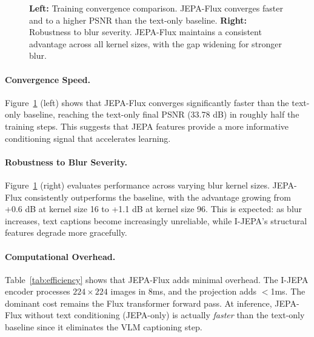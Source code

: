 \documentclass{article}
\begin{document}
\begin{figure}[t]
    \caption{\textbf{Left:} Training convergence comparison. JEPA-Flux converges faster and to a higher PSNR than the text-only baseline. \textbf{Right:} Robustness to blur severity. JEPA-Flux maintains a consistent advantage across all kernel sizes, with the gap widening for stronger blur.}
    \label{fig:analysis}
\end{figure}

\paragraph{Convergence Speed.}
Figure~\ref{fig:analysis} (left) shows that JEPA-Flux converges significantly faster than the text-only baseline, reaching the text-only final PSNR (33.78 dB) in roughly half the training steps. This suggests that JEPA features provide a more informative conditioning signal that accelerates learning.

\paragraph{Robustness to Blur Severity.}
Figure~\ref{fig:analysis} (right) evaluates performance across varying blur kernel sizes. JEPA-Flux consistently outperforms the baseline, with the advantage growing from +0.6 dB at kernel size 16 to +1.1 dB at kernel size 96. This is expected: as blur increases, text captions become increasingly unreliable, while I-JEPA's structural features degrade more gracefully.

\paragraph{Computational Overhead.}
Table~\ref{tab:efficiency} shows that JEPA-Flux adds minimal overhead. The I-JEPA encoder processes $224 \times 224$ images in 8ms, and the projection adds $<$1ms. The dominant cost remains the Flux transformer forward pass. At inference, JEPA-Flux without text conditioning (JEPA-only) is actually \emph{faster} than the text-only baseline since it eliminates the VLM captioning step.
\end{document}
